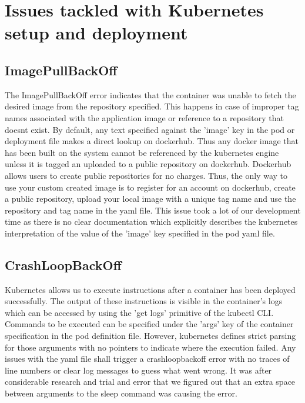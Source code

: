 \documentclass[9pt,twocolumn,twoside]{../../styles/osajnl}
\begin{document}
\section{Issues tackled with Kubernetes setup and deployment}

\subsection{ImagePullBackOff}
The ImagePullBackOff error indicates that the container was unable to
fetch the desired image from the repository specified. This happens in
case of improper tag names associated with the application image or
reference to a repository that doesnt exist.  By default, any text
specified against the 'image' key in the pod or deployment file makes
a direct lookup on dockerhub. Thus any docker image that has been
built on the system cannot be referenced by the kubernetes engine
unless it is tagged an uploaded to a public repository on
dockerhub. Dockerhub allows users to create public repositories for no
charges. Thus, the only way to use your custom created image is to
register for an account on dockerhub, create a public repository,
upload your local image with a unique tag name and use the repository
and tag name in the yaml file. This issue took a lot of our
development time as there is no clear documentation which explicitly
describes the kubernetes interpretation of the value of the 'image'
key specified in the pod yaml file.

\subsection{CrashLoopBackOff}
Kubernetes allows us to execute instructions after a container has
been deployed successfully. The output of these instructions is
visible in the container's logs which can be accessed by using the
'get logs' primitive of the kubectl CLI. Commands to be executed can
be specified under the 'args' key of the container specification in
the pod definition file. However, kubernetes defines strict parsing
for those arguments with no pointers to indicate where the execution
failed. Any issues with the yaml file shall trigger a crashloopbackoff
error with no traces of line numbers or clear log messages to guess
what went wrong. It was after considerable research and trial and
error that we figured out that an extra space between arguments to the
sleep command was causing the error.
\end{document}
